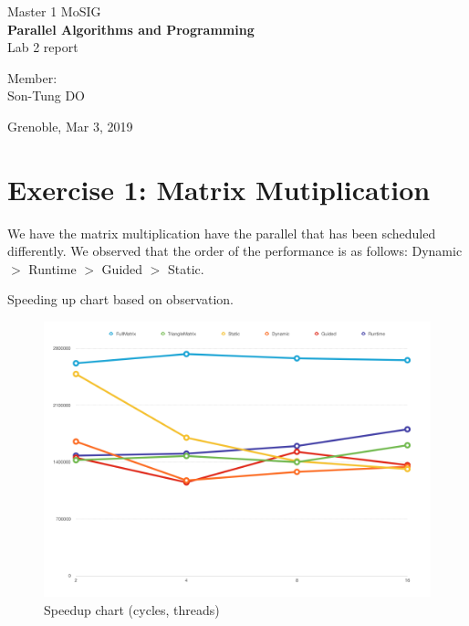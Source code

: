 \documentclass{article}
\begin{document}
\begin{titlepage}
\begin{center}


{\large Master 1 MoSIG}\\[0.5cm]
\vspace*{10cm}
{\Huge \textbf{Parallel Algorithms and Programming} }\\[0.5cm]
{\large Lab 2 report} \\[3cm]

\noindent
\begin{minipage}{0.4\textwidth}

   \centering Member:\\Son-Tung DO

\end{minipage}%

\vfill
{Grenoble, Mar 3, 2019}
\clearpage


\end{center}
\end{titlepage}

\section{Exercise 1: Matrix Mutiplication}
We have the matrix multiplication have the parallel that has been scheduled differently. We observed that the order of the performance is as follows: Dynamic $>$ Runtime $>$ Guided $>$ Static.


Speeding up chart based on observation.
\begin{figure}[H]
	\includegraphics[width=\textwidth]{images/matrixChart.png}
	\caption{Speedup chart (cycles, threads)}
\end{figure}
\end{document}
